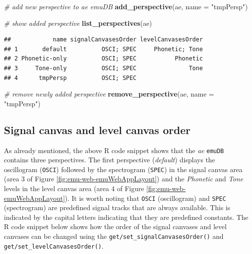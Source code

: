 \documentclass[]{book}
\newenvironment{Shaded}{\begin{snugshade}}{\end{snugshade}}
\newcommand{\CommentTok}[1]{\textcolor[rgb]{0.56,0.35,0.01}{\textit{#1}}}
\newcommand{\DataTypeTok}[1]{\textcolor[rgb]{0.13,0.29,0.53}{#1}}
\newcommand{\KeywordTok}[1]{\textcolor[rgb]{0.13,0.29,0.53}{\textbf{#1}}}
\newcommand{\NormalTok}[1]{#1}
\newcommand{\StringTok}[1]{\textcolor[rgb]{0.31,0.60,0.02}{#1}}
\theoremstyle{definition}
\theoremstyle{definition}
\theoremstyle{definition}
\theoremstyle{remark}
\begin{document}
\begin{Shaded}
\begin{Highlighting}[]
\CommentTok{# add new perspective to ae emuDB}
\KeywordTok{add_perspective}\NormalTok{(ae,}
                \DataTypeTok{name =} \StringTok{"tmpPersp"}\NormalTok{)}

\CommentTok{# show added perspective}
\KeywordTok{list_perspectives}\NormalTok{(ae)}
\end{Highlighting}
\end{Shaded}

\begin{verbatim}
##            name signalCanvasesOrder levelCanvasesOrder
## 1       default          OSCI; SPEC     Phonetic; Tone
## 2 Phonetic-only          OSCI; SPEC           Phonetic
## 3     Tone-only          OSCI; SPEC               Tone
## 4      tmpPersp          OSCI; SPEC
\end{verbatim}

\begin{Shaded}
\begin{Highlighting}[]
\CommentTok{# remove newly added perspective}
\KeywordTok{remove_perspective}\NormalTok{(ae,}
                   \DataTypeTok{name =} \StringTok{"tmpPersp"}\NormalTok{)}
\end{Highlighting}
\end{Shaded}

\hypertarget{signal-canvas-and-level-canvas-order}{%
\subsection{Signal canvas and level canvas
order}\label{signal-canvas-and-level-canvas-order}}

As already mentioned, the above R code snippet shows that the \emph{ae}
\texttt{emuDB} contains three perspectives. The first perspective
(\emph{default}) displays the oscillogram (\texttt{OSCI}) followed by
the spectrogram (\texttt{SPEC}) in the signal canvas area (area 3 of
Figure \ref{fig:emu-web-emuWebAppLayout}) and the \emph{Phonetic} and
\emph{Tone} levels in the level canvas area (area 4 of Figure
\ref{fig:emu-web-emuWebAppLayout}). It is worth noting that
\texttt{OSCI} (oscillogram) and \texttt{SPEC} (spectrogram) are
predefined signal tracks that are always available. This is indicated by
the capital letters indicating that they are predefined constants. The R
code snippet below shows how the order of the signal canvases and level
canvases can be changed using the
\texttt{get/set\_signalCanvasesOrder()} and
\texttt{get/set\_levelCanvasesOrder()}.
\end{document}
